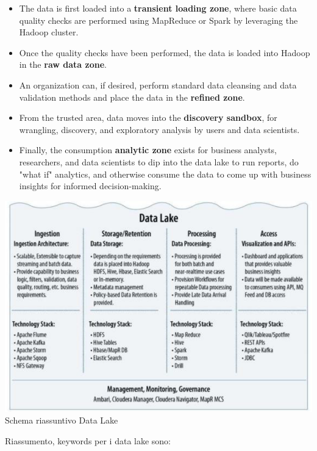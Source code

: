 \documentclass[a4page, 11pt]{article}
\begin{document}
\begin{itemize}
\item The data is first loaded into a \textbf{transient loading zone}, where basic data quality checks are performed using MapReduce or Spark by leveraging the Hadoop cluster. 
\item Once the quality checks have been performed, the data is loaded into Hadoop in the \textbf{raw data zone}.

\item An organization can, if desired, perform standard data cleansing and data validation methods and place the data in the \textbf{refined zone}. 

\item From the trusted area, data moves into the \textbf{discovery sandbox}, for wrangling, discovery, and exploratory analysis by users and data scientists.

\item Finally, the consumption \textbf{analytic zone} exists for business analysts, researchers, and data scientists to dip into the data lake to run reports, do "what if" analytics, and otherwise consume the data to come up with business insights for informed decision-making.

\end{itemize}

\begin{center}
\includegraphics[scale=0.70]{IMAGE10.png}\\
Schema riassuntivo Data Lake
\end{center}

Riassumento, keywords per i data lake sono:
\end{document}
